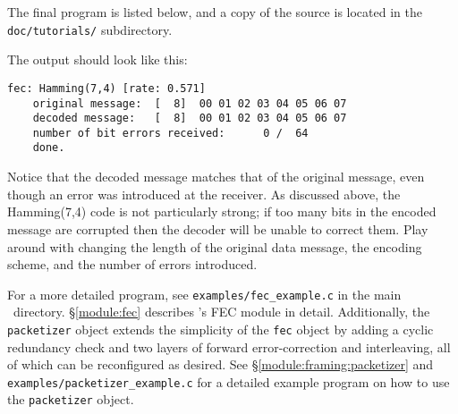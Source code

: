 The final program is listed below,
and a copy of the source is located in the {\tt doc/tutorials/}
subdirectory.
%

%
The output should look like this:
%
\begin{Verbatim}[fontsize=\small]
    fec: Hamming(7,4) [rate: 0.571]
    original message:  [  8]  00 01 02 03 04 05 06 07
    decoded message:   [  8]  00 01 02 03 04 05 06 07
    number of bit errors received:      0 /  64
    done.
\end{Verbatim}
%
Notice that the decoded message matches that of the original message,
even though an error was introduced at the receiver.
As discussed above, the Hamming(7,4) code is not particularly strong;
if too many bits in the encoded message are corrupted then the decoder
will be unable to correct them.
Play around with changing the length of the original data message,
the encoding scheme, and the number of errors introduced.

For a more detailed program, see {\tt examples/fec\_example.c} in the
main \liquid\ directory.
\S\ref{module:fec} describes \liquid's FEC module in detail.
Additionally, the {\tt packetizer} object extends the simplicity of the
{\tt fec} object by adding a cyclic redundancy check and two layers of
forward error-correction and interleaving, all of which can be
reconfigured as desired.
See \S\ref{module:framing:packetizer} and
{\tt examples/packetizer\_example.c} for a detailed example program
on how to use the {\tt packetizer} object.

